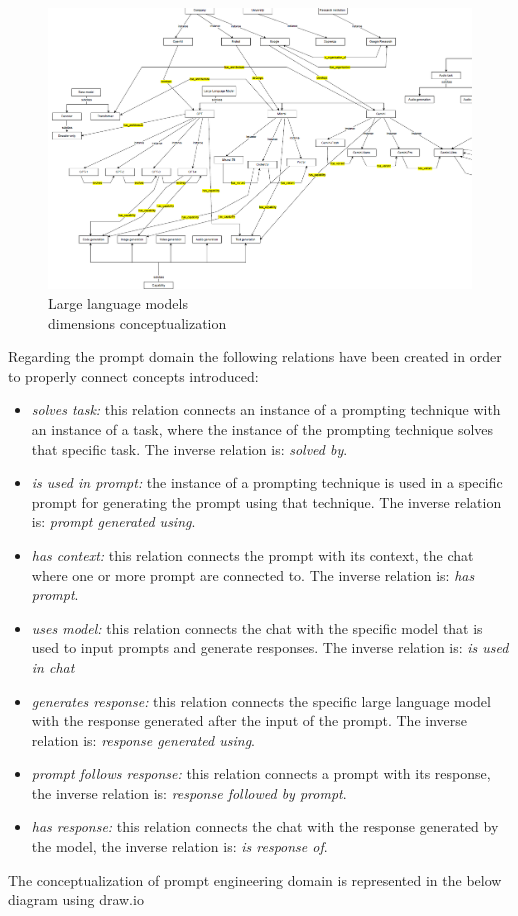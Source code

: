 \begin{figure}[H]
    \centering
    \includegraphics[width=0.9\linewidth]{Figures/fig_26.png}
    \caption{Large language models\\ dimensions conceptualization}
    \label{fig:enter-label}
\end{figure}
Regarding the prompt domain the following relations have been created in order to properly connect concepts introduced:
\begin{itemize}
    \item \textit{solves task:} this relation connects an instance of a prompting technique with an instance of a task, where the instance of the prompting technique solves that specific task. The inverse relation is: \textit{solved by}.

    \item \textit{is used in prompt:} the instance of a prompting technique is used in a specific prompt for generating the prompt using that technique. The inverse relation is: \textit{prompt generated using}.

    \item \textit{has context:} this relation connects the prompt with its context, the chat where one or more prompt are connected to. The inverse relation is: \textit{has prompt}.

    \item \textit{uses model:} this relation connects the chat with the specific model that is used to input prompts and generate responses. The inverse relation is: \textit{is used in chat}

    \item \textit{generates response:} this relation connects the specific large language model with the response generated after the input of the prompt. The inverse relation is: \textit{response generated using}.

    \item \textit{prompt follows response:} this relation connects a prompt with its response, the inverse relation is: \textit{response followed by prompt}.

    \item \textit{has response:} this relation connects the chat with the response generated by the model, the inverse relation is: \textit{is response of}. 
\end{itemize}
The conceptualization of prompt engineering domain is represented in the below diagram using draw.io


